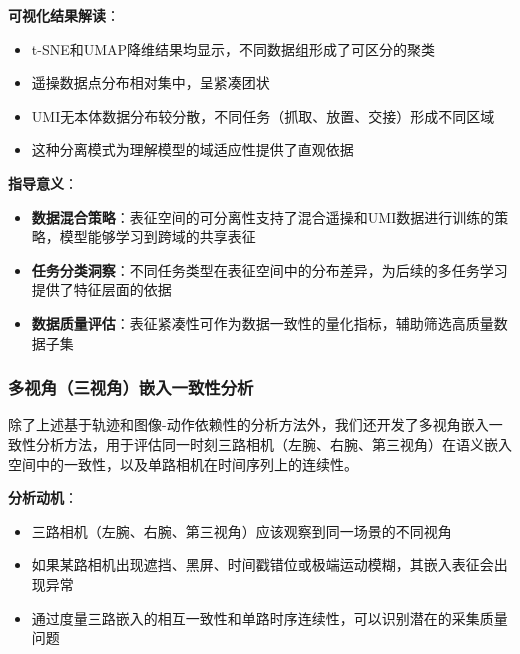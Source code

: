 \textbf{可视化结果解读}：
\begin{itemize}[leftmargin=2em]
    \item t-SNE和UMAP降维结果均显示，不同数据组形成了可区分的聚类
    \item 遥操数据点分布相对集中，呈紧凑团状
    \item UMI无本体数据分布较分散，不同任务（抓取、放置、交接）形成不同区域
    \item 这种分离模式为理解模型的域适应性提供了直观依据
\end{itemize}

\textbf{指导意义}：
\begin{itemize}[leftmargin=2em]
    \item \textbf{数据混合策略}：表征空间的可分离性支持了混合遥操和UMI数据进行训练的策略，模型能够学习到跨域的共享表征
    \item \textbf{任务分类洞察}：不同任务类型在表征空间中的分布差异，为后续的多任务学习提供了特征层面的依据
    \item \textbf{数据质量评估}：表征紧凑性可作为数据一致性的量化指标，辅助筛选高质量数据子集
\end{itemize}

\subsubsection{多视角（三视角）嵌入一致性分析}

除了上述基于轨迹和图像-动作依赖性的分析方法外，我们还开发了多视角嵌入一致性分析方法，用于评估同一时刻三路相机（左腕、右腕、第三视角）在语义嵌入空间中的一致性，以及单路相机在时间序列上的连续性。

\textbf{分析动机}：
\begin{itemize}[leftmargin=2em]
    \item 三路相机（左腕、右腕、第三视角）应该观察到同一场景的不同视角
    \item 如果某路相机出现遮挡、黑屏、时间戳错位或极端运动模糊，其嵌入表征会出现异常
    \item 通过度量三路嵌入的相互一致性和单路时序连续性，可以识别潜在的采集质量问题
\end{itemize}

